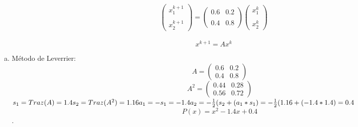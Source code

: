  \begin{frame}
  \begin{solution}
        \begin{equation*}
            \begin{pmatrix}x_{1}^{k+1}\\\\x_{2}^{k+1}\end{pmatrix}
            =
            \begin{pmatrix}0.6 & 0.2\\\\0.4 & 0.8 \end{pmatrix}
            \begin{pmatrix}x_{1}^{k}\\\\x_{2}^{k}\end{pmatrix}
         \end{equation*}
         \\
         \begin{equation*}
            x^{k+1}=Ax^{k}
         \end{equation*}
      \begin{enumerate}[c)]
			\item
            Método de Leverrier:\\
            \begin{equation*}
            A=\begin{pmatrix}0.6 & 0.2\\0.4 & 0.8 \end{pmatrix}
            
         \end{equation*}
         \begin{equation*}
            A^{2}=\begin{pmatrix}0.44 & 0.28\\0.56 & 0.72 \end{pmatrix}
         \end{equation*}
         \begin{math}
        s_{1}=Traz(A)=1.4\\
            s_{2}=Traz(A^{2})=1.16\\
            a_{1}=-s_{1}=-1.4\\
            a_{2}=-\frac{1}{2}(s_{2}+(a_{1}*s_{1})=-\frac{1}{2}(1.16+(-1.4*1.4)=0.4\\
         \end{math}
        \begin{equation*}
            P(x)=x^{2}-1.4x+0.4
         \end{equation*}
			      .
		\end{enumerate}
   
  \end{solution}
  \end{frame}
  
